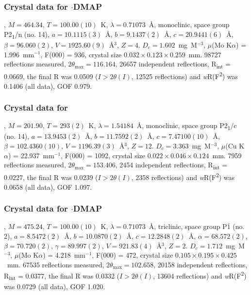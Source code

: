 \begin{refsection}
\subsubsection{Crystal data for \texorpdfstring{$\cdot$DMAP}{C21 H18 F3 N3 O Se}}
, $M=464.34$, $T=100.00(10)$~K, $\lambda=0.71073$~\AA, monoclinic, space group P2\textsubscript{1}/n (no. 14), $a = 10.1115(3)$~\AA, $b = 9.1437(2)$~\AA, $c = 20.9441(6)$~\AA, $\beta = 96.060(2)$\degree, $V = 1925.60(9)$~\AA$^{3}$, $Z = 4$. $D_{c}= 1.602$~mg~M$^{-3}$, $\mu$(Mo K$\alpha$) = 1.996~mm$^{-1}$, F(000) = 936, crystal size $0.032 \times 0.123 \times 0.259$~mm. 98727 reflections measured, $2\theta_{\mathrm{max}}=116.164$\degree, 26657 independent reflections, R\textsubscript{int} = 0.0669, the final R was 0.0509 ($I > 2\theta(I)$, 12525 reflections) and \emph{w}R(F\textsuperscript{2}) was 0.1406 (all data), GOF 0.979.

\subsubsection{Crystal data for \texorpdfstring{}{C H Br N O Se}}
, $M=201.90$, $T=293(2)$~K, $\lambda=1.54184$~\AA, monoclinic, space group P2\textsubscript{1}/c (no. 14), $a = 13.9453(2)$~\AA, $b = 11.7592(2)$~\AA, $c = 7.47100(10)$~\AA, $\beta = 102.4360(10)$\degree, $V = 1196.39(3)$~\AA$^{3}$, $Z = 12$. $D_{c}= 3.363$~mg~M$^{-3}$, $\mu$(Cu K$\alpha$) = 22.937~mm$^{-1}$, F(000) = 1092, crystal size $0.022 \times 0.046 \times 0.124$~mm. 7959 reflections measured, $2\theta_{\mathrm{max}}=153.406$\degree, 2454 independent reflections, R\textsubscript{int} = 0.0227, the final R was 0.0239 ($I > 2\theta(I)$, 2358 reflections) and \emph{w}R(F\textsuperscript{2}) was 0.0658 (all data), GOF 1.097.

\subsubsection{Crystal data for \texorpdfstring{$\cdot$DMAP}{C20 H18 Br N3 O Se}}
, $M=475.24$, $T=100.00(10)$~K, $\lambda=0.71073$~\AA, triclinic, space group P$\bar{1}$ (no. 2), $a = 8.5472(2)$~\AA, $b = 10.0870(2)$~\AA, $c = 12.2848(2)$~\AA, $\alpha = 68.572(2)$\degree, $\beta = 70.720(2)$\degree, $\gamma = 89.997(2)$\degree, $V = 921.83(4)$~\AA$^{3}$, $Z = 2$. $D_{c}= 1.712$~mg~M$^{-3}$, $\mu$(Mo K$\alpha$) = 4.218~mm$^{-1}$, F(000) = 472, crystal size $0.105 \times 0.195 \times 0.425$~mm. 67535 reflections measured, $2\theta_{\mathrm{max}}=102.658$\degree, 20158 independent reflections, R\textsubscript{int} = 0.0377, the final R was 0.0332 ($I > 2\theta(I)$, 13604 reflections) and \emph{w}R(F\textsuperscript{2}) was 0.0729 (all data), GOF 1.020.


\end{refsection}
